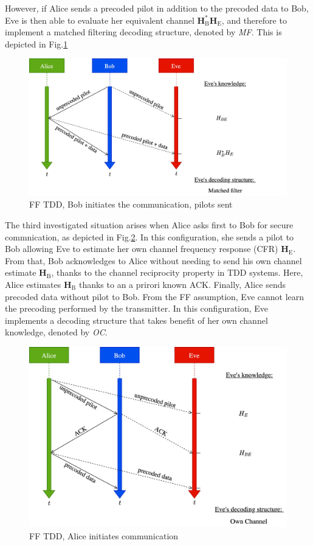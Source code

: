 \documentclass[journal,comsoc]{IEEEtran}
\let\MYoriglatexcaption\caption
\renewcommand{\caption}[2][\relax]{\MYoriglatexcaption[#2]{#2}}
\newcommand{\HE}{\textbf{H}_{\text{E}}}
\newcommand{\HB}{\textbf{H}_{\text{B}}}
\begin{document}
However, if Alice sends a precoded pilot in addition to the  precoded data to Bob, Eve is then able to evaluate her equivalent channel $\HB^*\HE$, and therefore to implement a matched filtering decoding structure, denoted by \textit{MF}. This is depicted in Fig.\ref{fig_ff_tdd_b_pilot}
\begin{figure}[!htb]
	\centering
	\includegraphics[width=.95\linewidth]{graphs/diagram_sequence-FF_TDD_B_pilot.jpg}
	\caption{FF TDD, Bob initiates the communication, pilots sent}
	\label{fig_ff_tdd_b_pilot}
\end{figure}

The third investigated situation arises when Alice asks first to Bob for secure commnication, as depicted in Fig.\ref{fig_ff_tdd_a}. In this configuration, she sends a pilot to Bob allowing Eve to estimate her own channel frequency response (CFR) $\HE$. From that, Bob acknowledges to Alice without needing to send his own channel estimate $\HB$, thanks to the channel reciprocity property in TDD systems. Here, Alice estimates $\HB$ thanks to an a prirori known ACK. Finally, Alice sends precoded data without pilot to Bob. From the FF assumption, Eve cannot learn the precoding performed by the transmitter. In this configuration, Eve implements  a decoding structure that takes benefit of her own channel knowledge, denoted by \textit{OC}. 
\begin{figure}[!htb]
	\centering
	\includegraphics[width=.85\linewidth]{graphs/diagram_sequence-FF_TDD_A.jpg}
	\caption{FF TDD, Alice initiates communication}
	\label{fig_ff_tdd_a}
\end{figure}
\end{document}
